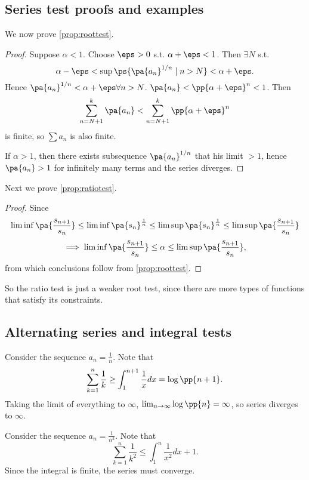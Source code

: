 \documentclass[11pt]{scrartcl}
\numberwithin{equation}{section}
\begin{document}
\subsection{Series test proofs and examples}
We now prove \cref{prop:roottest}.
\begin{proof}
    Suppose $\alpha<1$. Choose $\eps>0$ s.t. $\alpha+\eps < 1$.
    Then $\exists N$ s.t.  
    \[ \alpha-\eps < \sup\ps{\pa{a_n}^{1/n}\mid n > N} < 
    \alpha + \eps. \]
    Hence $\pa{a_n}^{1/n} < \alpha+\eps \forall n > N$.
    $\pa{a_n} < \pp{\alpha+\eps}^n < 1$. Then 
    \[ \sum_{n=N+1}^{k}\pa{a_n} < \sum_{n=N+1}^{k}\pp{\alpha+\eps}^n\]
    is finite, so $\sum a_n$ is also finite.
    
    If $\alpha>1$, then there exists subsequence 
    $\pa{a_n}^{1/n}$ that his limit $>1$,
    hence $\pa{a_n} > 1$ for infinitely many terms and the series diverges.
\end{proof}
Next we prove \cref{prop:ratiotest}.
\begin{proof}
    Since 
    \[ \liminf \pa{\frac{s_{n+1}}{s_n}} \leq \liminf \pa{s_n}^{\frac{1}{n}}
    \leq \limsup \pa{s_n}^{\frac{1}{n}}\leq \limsup \pa{\frac{s_{n+1}}{s_n}}\]
    \[ \implies\liminf \pa{\frac{s_{n+1}}{s_n}} \leq \alpha\leq \limsup \pa{\frac{s_{n+1}}{s_n}},\]
    from which conclusions follow from \cref{prop:roottest}.
\end{proof}

So the ratio test is just a weaker root test, since there are more types of 
functions that satisfy its constraints.

\subsection{Alternating series and integral tests}

\begin{example}
    Consider the sequence $a_n = \frac{1}{n}$. Note that
    \[ \sum_{k=1}^{n}\frac{1}{k} \geq \int_{1}^{n+1}\frac{1}{x}dx = \log\pp{n+1}.\] 
    Taking the limit of everything to $\infty$, 
    $\lim_{n\rightarrow \infty}{\log\pp{n}} = \infty$,
    so series diverges to $\infty$.
\end{example}

\begin{example}
    Consider the sequence $a_n = \frac{1}{n^2}$. Note that
    \[ \sum_{k=1}^{n}\frac{1}{k^2} \leq \int_{1}^{n}\frac{1}{x^2}dx + 1.\]
    Since the integral is finite, the series must converge.
\end{example}
\end{document}
